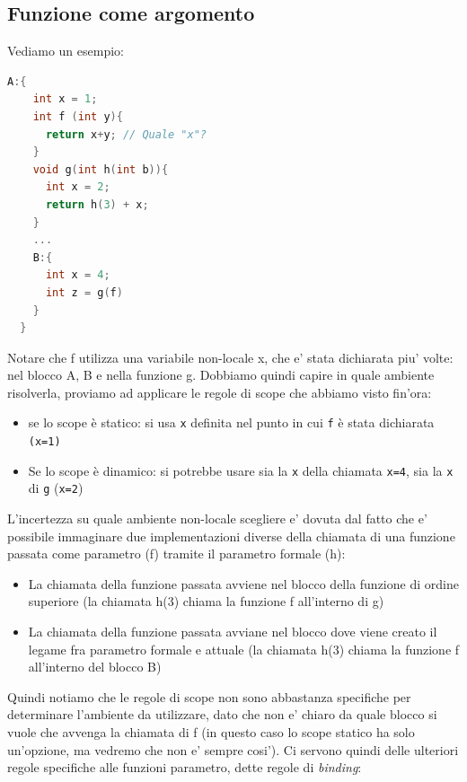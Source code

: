 \subsection{Funzione come argomento}
Vediamo un esempio:
\begin{lstlisting}[language = C]
  A:{
    int x = 1;
    int f (int y){
      return x+y; // Quale "x"?
    }
    void g(int h(int b)){
      int x = 2;
      return h(3) + x;
    }
    ...
    B:{
      int x = 4;
      int z = g(f)
    }
  }
\end{lstlisting}
Notare che f utilizza una variabile non-locale x, che e' stata dichiarata piu' volte: nel blocco A, B e nella funzione g. Dobbiamo quindi capire in quale ambiente risolverla, proviamo ad applicare le regole di scope che abbiamo visto fin'ora:
\begin{itemize}
    \item se lo scope è statico: si usa \texttt{x} definita nel punto in cui \texttt{f} è stata dichiarata \texttt{(x=1)}
    \item Se lo scope è dinamico: si potrebbe usare sia la \texttt{x} della chiamata \texttt{x=4}, sia la \texttt{x} di \texttt{g} (\texttt{x=2})
\end{itemize}

L'incertezza su quale ambiente non-locale scegliere e' dovuta dal fatto che e' possibile immaginare due implementazioni diverse della chiamata di una funzione passata come parametro (f) tramite il parametro formale (h):

\begin{itemize}
  \item La chiamata della funzione passata avviene nel blocco della funzione di ordine superiore (la chiamata h(3) chiama la funzione f all'interno di g)
  \item La chiamata della funzione passata avviane nel blocco dove viene creato il legame fra parametro formale e attuale (la chiamata h(3) chiama la funzione f all'interno del blocco B)
\end{itemize}

Quindi notiamo che le regole di scope non sono abbastanza specifiche per determinare l'ambiente da utilizzare, dato che non e' chiaro da quale blocco si vuole che avvenga la chiamata di f (in questo caso lo scope statico ha solo un'opzione, ma vedremo che non e' sempre cosi'). Ci servono quindi delle ulteriori regole specifiche alle funzioni parametro, dette regole di \textit{binding}:


